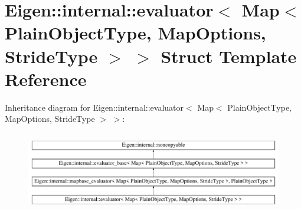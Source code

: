 \hypertarget{struct_eigen_1_1internal_1_1evaluator_3_01_map_3_01_plain_object_type_00_01_map_options_00_01_stride_type_01_4_01_4}{}\section{Eigen\+::internal\+::evaluator$<$ Map$<$ Plain\+Object\+Type, Map\+Options, Stride\+Type $>$ $>$ Struct Template Reference}
\label{struct_eigen_1_1internal_1_1evaluator_3_01_map_3_01_plain_object_type_00_01_map_options_00_01_stride_type_01_4_01_4}
Inheritance diagram for Eigen\+::internal\+::evaluator$<$ Map$<$ Plain\+Object\+Type, Map\+Options, Stride\+Type $>$ $>$\+:\begin{figure}[H]
\begin{center}
\leavevmode
\includegraphics[height=3.549921cm]{struct_eigen_1_1internal_1_1evaluator_3_01_map_3_01_plain_object_type_00_01_map_options_00_01_stride_type_01_4_01_4}
\end{center}
\end{figure}
